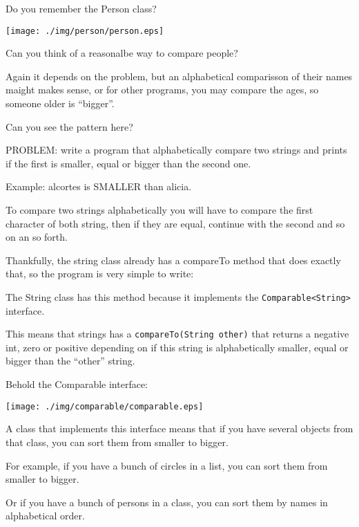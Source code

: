 \documentclass[a4paper, 9pt]{extarticle}
\newcommand{\separator}{\begin{center}%
\noindent\makebox[\linewidth]{\rule{0.75\paperwidth}{0.4pt}}%
\end{center}}
\begin{document}
\separator

Do you remember the Person class?

\begin{center}
  \texttt{[image: ./img/person/person.eps]}
\end{center}

Can you think of a reasonalbe way to compare people?

Again it depends on the problem, but an alphabetical comparisson of their names
maight makes sense, or for other programs, you may compare the ages, so someone
older is ``bigger''.

Can you see the pattern here?

\separator

PROBLEM: write a program that alphabetically compare two strings and prints if
the first is smaller, equal or bigger than the second one.

Example: alcortes is SMALLER than alicia.

To compare two strings alphabetically you will have to compare the first
character of both string, then if they are equal, continue with the second and
so on an so forth.

Thankfully, the string class already has a compareTo method that does exactly
that, so the program is very simple to write:


The String class has this method because it implements the \verb+Comparable<String>+ interface.

This means that strings has a \verb+compareTo(String other)+ that returns a
negative int, zero or positive depending on if this string is alphabetically
smaller, equal or bigger than the ``other'' string.

Behold the Comparable interface:

\begin{center}
  \texttt{[image: ./img/comparable/comparable.eps]}
\end{center}

A class that implements this interface means that if you have several objects
from that class, you can sort them from smaller to bigger.

For example, if you have a bunch of circles in a list, you can sort them from smaller to bigger.

Or if you have a bunch of persons in a class, you can sort them by names in alphabetical order.
\end{document}
